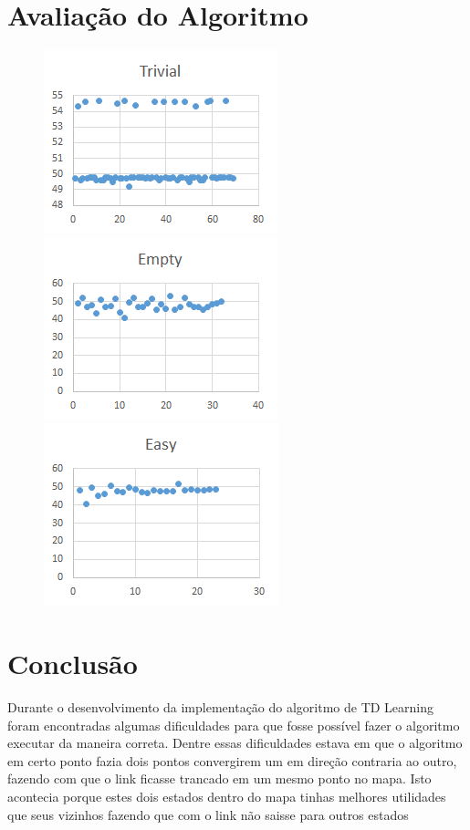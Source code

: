 \documentclass[letterpaper]{article}
\begin{document}
\section{Avaliação do Algoritmo}

\begin{figure}[h]
\includegraphics{trivial}\\
\includegraphics{empty}\\
\includegraphics{easy}
\centering
\end{figure}

\section{Conclusão}

Durante o desenvolvimento da implementação do algoritmo de TD Learning foram encontradas algumas dificuldades para que fosse possível fazer o algoritmo
executar da maneira correta. Dentre essas dificuldades estava em que o algoritmo em certo ponto fazia dois pontos convergirem um em direção contraria
ao outro, fazendo com que o link ficasse trancado em um mesmo ponto no mapa. Isto acontecia porque estes dois estados dentro do mapa tinhas melhores
utilidades que seus vizinhos fazendo que com o link não saisse para outros estados
\end{document}
